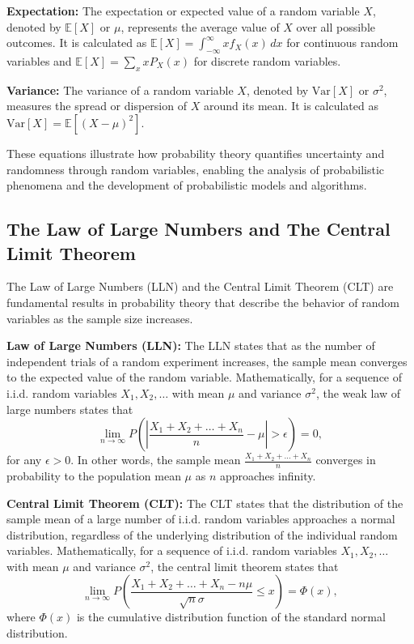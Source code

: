 \documentclass[12pt]{book} %
\begin{document}
\textbf{Expectation:} The expectation or expected value of a random variable \(X\), denoted by \(\mathbb{E}[X]\) or \(\mu\), represents the average value of \(X\) over all possible outcomes. It is calculated as \(\mathbb{E}[X] = \int_{-\infty}^\infty x f_X(x) \, dx\) for continuous random variables and \(\mathbb{E}[X] = \sum_{x} x P_X(x)\) for discrete random variables.

\textbf{Variance:} The variance of a random variable \(X\), denoted by \(\text{Var}[X]\) or \(\sigma^2\), measures the spread or dispersion of \(X\) around its mean. It is calculated as \(\text{Var}[X] = \mathbb{E}[(X - \mu)^2]\).

These equations illustrate how probability theory quantifies uncertainty and randomness through random variables, enabling the analysis of probabilistic phenomena and the development of probabilistic models and algorithms.

\subsection{The Law of Large Numbers and The Central Limit Theorem}
The Law of Large Numbers (LLN) and the Central Limit Theorem (CLT) are fundamental results in probability theory that describe the behavior of random variables as the sample size increases.

\textbf{Law of Large Numbers (LLN):} The LLN states that as the number of independent trials of a random experiment increases, the sample mean converges to the expected value of the random variable. Mathematically, for a sequence of i.i.d. random variables \(X_1, X_2, \ldots\) with mean \(\mu\) and variance \(\sigma^2\), the weak law of large numbers states that
\[
\lim_{n \to \infty} P\left(\left|\frac{X_1 + X_2 + \ldots + X_n}{n} - \mu\right| > \epsilon\right) = 0,
\]
for any \(\epsilon > 0\). In other words, the sample mean \(\frac{X_1 + X_2 + \ldots + X_n}{n}\) converges in probability to the population mean \(\mu\) as \(n\) approaches infinity.

\textbf{Central Limit Theorem (CLT):} The CLT states that the distribution of the sample mean of a large number of i.i.d. random variables approaches a normal distribution, regardless of the underlying distribution of the individual random variables. Mathematically, for a sequence of i.i.d. random variables \(X_1, X_2, \ldots\) with mean \(\mu\) and variance \(\sigma^2\), the central limit theorem states that
\[
\lim_{n \to \infty} P\left(\frac{X_1 + X_2 + \ldots + X_n - n\mu}{\sqrt{n}\sigma} \leq x\right) = \Phi(x),
\]
where \(\Phi(x)\) is the cumulative distribution function of the standard normal distribution.
\end{document}
